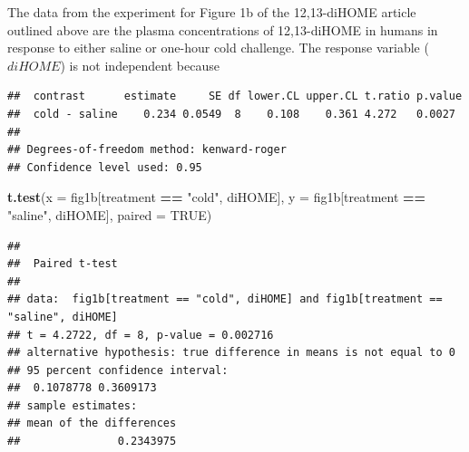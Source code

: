 \documentclass[]{book}
\newenvironment{Shaded}{\begin{snugshade}}{\end{snugshade}}
\newcommand{\CommentTok}[1]{\textcolor[rgb]{0.56,0.35,0.01}{\textit{#1}}}
\newcommand{\DataTypeTok}[1]{\textcolor[rgb]{0.13,0.29,0.53}{#1}}
\newcommand{\DecValTok}[1]{\textcolor[rgb]{0.00,0.00,0.81}{#1}}
\newcommand{\KeywordTok}[1]{\textcolor[rgb]{0.13,0.29,0.53}{\textbf{#1}}}
\newcommand{\NormalTok}[1]{#1}
\newcommand{\OperatorTok}[1]{\textcolor[rgb]{0.81,0.36,0.00}{\textbf{#1}}}
\newcommand{\OtherTok}[1]{\textcolor[rgb]{0.56,0.35,0.01}{#1}}
\newcommand{\StringTok}[1]{\textcolor[rgb]{0.31,0.60,0.02}{#1}}
\begin{document}
The data from the experiment for Figure 1b of the 12,13-diHOME article outlined above are the plasma concentrations of 12,13-diHOME in humans in response to either saline or one-hour cold challenge. The response variable (\(diHOME\)) is not independent because

\begin{Shaded}
\end{Shaded}

\begin{verbatim}
##  contrast      estimate     SE df lower.CL upper.CL t.ratio p.value
##  cold - saline    0.234 0.0549  8    0.108    0.361 4.272   0.0027 
## 
## Degrees-of-freedom method: kenward-roger 
## Confidence level used: 0.95
\end{verbatim}

\begin{Shaded}
\begin{Highlighting}[]
\KeywordTok{t.test}\NormalTok{(}\DataTypeTok{x =}\NormalTok{ fig1b[treatment }\OperatorTok{==}\StringTok{ "cold"}\NormalTok{, diHOME],}
       \DataTypeTok{y =}\NormalTok{ fig1b[treatment }\OperatorTok{==}\StringTok{ "saline"}\NormalTok{, diHOME],}
       \DataTypeTok{paired =} \OtherTok{TRUE}\NormalTok{)}
\end{Highlighting}
\end{Shaded}

\begin{verbatim}
## 
##  Paired t-test
## 
## data:  fig1b[treatment == "cold", diHOME] and fig1b[treatment == "saline", diHOME]
## t = 4.2722, df = 8, p-value = 0.002716
## alternative hypothesis: true difference in means is not equal to 0
## 95 percent confidence interval:
##  0.1078778 0.3609173
## sample estimates:
## mean of the differences 
##               0.2343975
\end{verbatim}
\end{document}
